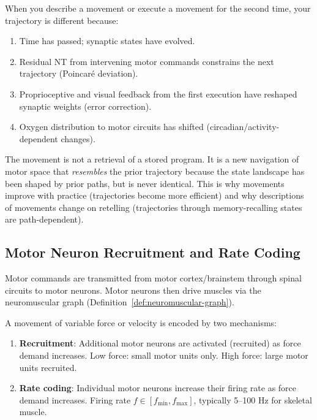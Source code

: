 \begin{corollary}
\label{cor:motor-memory-trajectory}
When you describe a movement or execute a movement for the second time, your trajectory is different because:
\begin{enumerate}[label=(\roman*), noitemsep]
\item Time has passed; synaptic states have evolved.
\item Residual NT from intervening motor commands constrains the next trajectory (Poincaré deviation).
\item Proprioceptive and visual feedback from the first execution have reshaped synaptic weights (error correction).
\item Oxygen distribution to motor circuits has shifted (circadian/activity-dependent changes).
\end{enumerate}

The movement is not a retrieval of a stored program. It is a new navigation of motor space that \emph{resembles} the prior trajectory because the state landscape has been shaped by prior paths, but is never identical. This is why movements improve with practice (trajectories become more efficient) and why descriptions of movements change on retelling (trajectories through memory-recalling states are path-dependent).
\end{corollary}

\subsection{Motor Neuron Recruitment and Rate Coding}
\label{subsec:motor-recruitment}

Motor commands are transmitted from motor cortex/brainstem through spinal circuits to motor neurons. Motor neurons then drive muscles via the neuromuscular graph (Definition~\ref{def:neuromuscular-graph}).

\begin{definition}
\label{def:recruitment-coding}
A movement of variable force or velocity is encoded by two mechanisms:
\begin{enumerate}[label=(\Roman*), noitemsep]
\item \textbf{Recruitment}: Additional motor neurons are activated (recruited) as force demand increases. Low force: small motor units only. High force: large motor units recruited.
\item \textbf{Rate coding}: Individual motor neurons increase their firing rate as force demand increases. Firing rate $f \in [f_{\min}, f_{\max}]$, typically 5--100 Hz for skeletal muscle.
\end{enumerate}
\end{definition}

